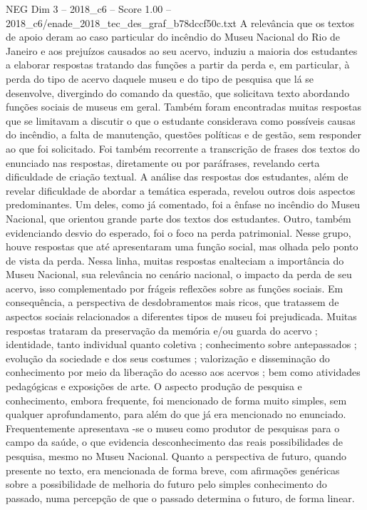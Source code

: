 \begin{textsample}{NEG Dim 3 – 2018\_c6 – Score 1.00 – 2018\_c6/enade\_2018\_tec\_des\_graf\_b78dccf50c.txt}
A relevância que os textos de apoio deram ao caso particular do incêndio do Museu Nacional do Rio de Janeiro e aos prejuízos causados ao seu acervo, induziu a maioria dos estudantes a elaborar respostas tratando das funções a partir da perda e, em particular, à perda do tipo de acervo daquele museu e do tipo de pesquisa que lá se desenvolve, divergindo do comando da questão, que solicitava texto abordando funções sociais de museus em geral.
Também foram encontradas muitas respostas que se limitavam a discutir o que o estudante considerava como possíveis causas do incêndio, a falta de manutenção, questões políticas e de gestão, sem responder ao que foi solicitado.
Foi também recorrente a transcrição de frases dos textos do enunciado nas respostas, diretamente ou por paráfrases, revelando certa dificuldade de criação textual.
A análise das respostas dos estudantes, além de revelar dificuldade de abordar a temática esperada, revelou outros dois aspectos predominantes.
Um deles, como já comentado, foi a ênfase no incêndio do Museu Nacional, que orientou grande parte dos textos dos estudantes.
Outro, também evidenciando desvio do esperado, foi o foco na perda patrimonial.
Nesse grupo, houve respostas que até apresentaram uma função social, mas olhada pelo ponto de vista da perda.
Nessa linha, muitas respostas enalteciam a importância do Museu Nacional, sua relevância no cenário nacional, o impacto da perda de seu acervo, isso complementado por frágeis reflexões sobre as funções sociais.
Em consequência, a perspectiva de desdobramentos mais ricos, que tratassem de aspectos sociais relacionados a diferentes tipos de museu foi prejudicada.
Muitas respostas trataram da preservação da memória e/ou guarda do acervo ; identidade, tanto individual quanto coletiva ; conhecimento sobre antepassados ; evolução da sociedade e dos seus costumes ; valorização e disseminação do conhecimento por meio da liberação do acesso aos acervos ; bem como atividades pedagógicas e exposições de arte.
O aspecto produção de pesquisa e conhecimento, embora frequente, foi mencionado de forma muito simples, sem qualquer aprofundamento, para além do que já era mencionado no enunciado.
Frequentemente apresentava -se o museu como produtor de pesquisas para o campo da saúde, o que evidencia desconhecimento das reais possibilidades de pesquisa, mesmo no Museu Nacional.
Quanto a perspectiva de futuro, quando presente no texto, era mencionada de forma breve, com afirmações genéricas sobre a possibilidade de melhoria do futuro pelo simples conhecimento do passado, numa percepção de que o passado determina o futuro, de forma linear.

\end{textsample}
